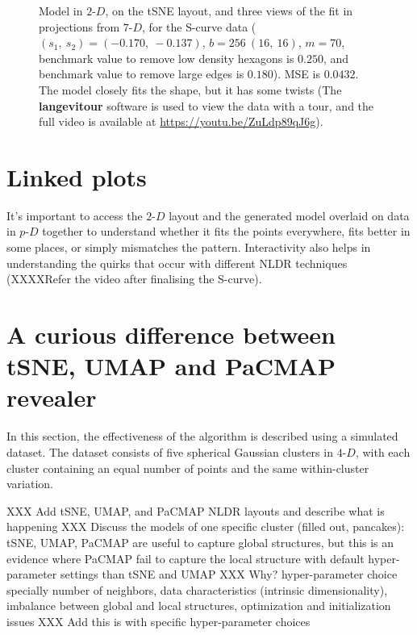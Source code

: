 \documentclass[
  12pt]{article}
\newcommand\pD{$p\text{-}D$}
\newcommand\gD{$2\text{-}D$}
\begin{document}
\begin{figure}[H]
\caption{\label{fig-scurve-sc-best}Model in \gD{}, on the tSNE layout,
and three views of the fit in projections from \(7\text{-}D\), for the
S-curve data (\((s_1, \ s_2) = (-0.170, \ -0.137)\),
\(b = 256 \  (16, \ 16)\), \(m = 70\), benchmark value to remove low
density hexagons is \(0.250\), and benchmark value to remove large edges
is \(0.180\)). MSE is \(0.0432\). The model closely fits the shape, but
it has some twists (The \textbf{langevitour} software is used to view
the data with a tour, and the full video is available at
\url{https://youtu.be/ZuLdp89qJ6g}).}

\end{figure}%

\section{Linked plots}\label{linked-plots}

It's important to access the \gD{} layout and the generated model
overlaid on data in \pD{} together to understand whether it fits the
points everywhere, fits better in some places, or simply mismatches the
pattern. Interactivity also helps in understanding the quirks that occur
with different NLDR techniques (XXXXRefer the video after finalising the
S-curve).

\section{A curious difference between tSNE, UMAP and PaCMAP
revealer}\label{a-curious-difference-between-tsne-umap-and-pacmap-revealer}

In this section, the effectiveness of the algorithm is described using a
simulated dataset. The dataset consists of five spherical Gaussian
clusters in \(4\text{-}D\), with each cluster containing an equal number
of points and the same within-cluster variation.

XXX Add tSNE, UMAP, and PaCMAP NLDR layouts and describe what is
happening XXX Discuss the models of one specific cluster (filled out,
pancakes): tSNE, UMAP, PaCMAP are useful to capture global structures,
but this is an evidence where PaCMAP fail to capture the local structure
with default hyper-parameter settings than tSNE and UMAP XXX Why?
hyper-parameter choice specially number of neighbors, data
characteristics (intrinsic dimensionality), imbalance between global and
local structures, optimization and initialization issues XXX Add this is
with specific hyper-parameter choices
\end{document}

